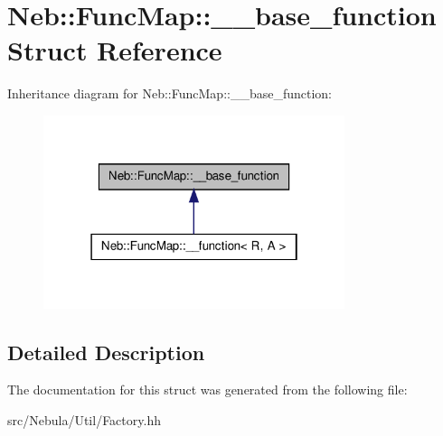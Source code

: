 \hypertarget{structNeb_1_1FuncMap_1_1____base__function}{\section{\-Neb\-:\-:\-Func\-Map\-:\-:\-\_\-\-\_\-base\-\_\-function \-Struct \-Reference}
\label{structNeb_1_1FuncMap_1_1____base__function}
}


\-Inheritance diagram for \-Neb\-:\-:\-Func\-Map\-:\-:\-\_\-\-\_\-base\-\_\-function\-:\nopagebreak
\begin{figure}[H]
\begin{center}
\leavevmode
\includegraphics[width=250pt]{structNeb_1_1FuncMap_1_1____base__function__inherit__graph}
\end{center}
\end{figure}


\subsection{\-Detailed \-Description}


\-The documentation for this struct was generated from the following file\-:\begin{DoxyCompactItemize}
\item 
src/\-Nebula/\-Util/\-Factory.\-hh\end{DoxyCompactItemize}
